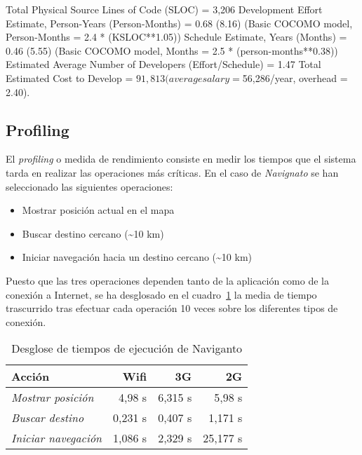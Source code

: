 \begin{listing}[
  float=ht,
  caption  = {Estimación de los costes del desarrollo de Naviganto según sloccount},
  label    = code:cocomo]
Total Physical Source Lines of Code (SLOC)                = 3,206
Development Effort Estimate, Person-Years (Person-Months) = 0.68 (8.16)
 (Basic COCOMO model, Person-Months = 2.4 * (KSLOC**1.05))
Schedule Estimate, Years (Months)                         = 0.46 (5.55)
 (Basic COCOMO model, Months = 2.5 * (person-months**0.38))
Estimated Average Number of Developers (Effort/Schedule)  = 1.47
Total Estimated Cost to Develop                           = $ 91,813
 (average salary = $56,286/year, overhead = 2.40).
\end{listing}

\subsection{Profiling}

El \emph{profiling} o medida de rendimiento consiste en medir los tiempos que el sistema tarda en
realizar las operaciones más críticas. En el caso de \emph{Navignato} se han seleccionado las
siguientes operaciones:

\begin{itemize}
  \item Mostrar posición actual en el mapa
  \item Buscar destino cercano (\textasciitilde{}10 km)
  \item Iniciar navegación hacia un destino cercano (\textasciitilde{}10 km)
\end{itemize}

Puesto que las tres operaciones dependen tanto de la aplicación como de la conexión a Internet, se
ha desglosado en el cuadro~\ref{cuadro:conexion} la media de tiempo trascurrido tras efectuar cada
operación 10 veces sobre los diferentes tipos de conexión.

\begin{table}[h]
  \centering
  \begin{tabular}{|l|r|r|r|}
    \hline
    \textbf{Acción} & \textbf{Wifi} & \textbf{3G} & \textbf{2G} \\
    \hline
    \emph{Mostrar posición}   &  4,98 s & 6,315 s &   5,98 s \\
    \hline
    \emph{Buscar destino}     & 0,231 s & 0,407 s &  1,171 s \\
    \hline
    \emph{Iniciar navegación} & 1,086 s & 2,329 s & 25,177 s \\
    \hline
  \end{tabular}
  \caption{Desglose de tiempos de ejecución de Naviganto}
  \label{cuadro:conexion}
\end{table}

